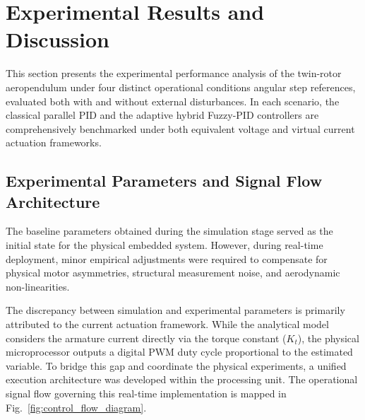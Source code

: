 \documentclass[pdflatex,sn-mathphys-num,iicol]{sn-jnl}
\theoremstyle{thmstyleone}%
\theoremstyle{thmstyletwo}%
\theoremstyle{thmstylethree}%
\begin{document}
\section{Experimental Results and Discussion}
\label{sec6}

This section presents the experimental performance analysis of the twin-rotor aeropendulum under four distinct operational conditions angular step references, evaluated both with and without external disturbances. In each scenario, the classical parallel PID and the adaptive hybrid Fuzzy-PID controllers are comprehensively benchmarked under both equivalent voltage and virtual current actuation frameworks. 

\subsection{Experimental Parameters and Signal Flow Architecture}
\label{sub:experimental_parameters}

The baseline parameters obtained during the simulation stage served as the initial state for the physical embedded system. However, during real-time deployment, minor empirical adjustments were required to compensate for physical motor asymmetries, structural measurement noise, and aerodynamic non-linearities. 

The discrepancy between simulation and experimental parameters is primarily attributed to the current actuation framework. While the analytical model considers the armature current directly via the torque constant ($K_t$), the physical microprocessor outputs a digital $\text{PWM}$ duty cycle proportional to the estimated variable. To bridge this gap and coordinate the physical experiments, a unified execution architecture was developed within the processing unit. The operational signal flow governing this real-time implementation is mapped in Fig.~\ref{fig:control_flow_diagram}.
\end{document}

